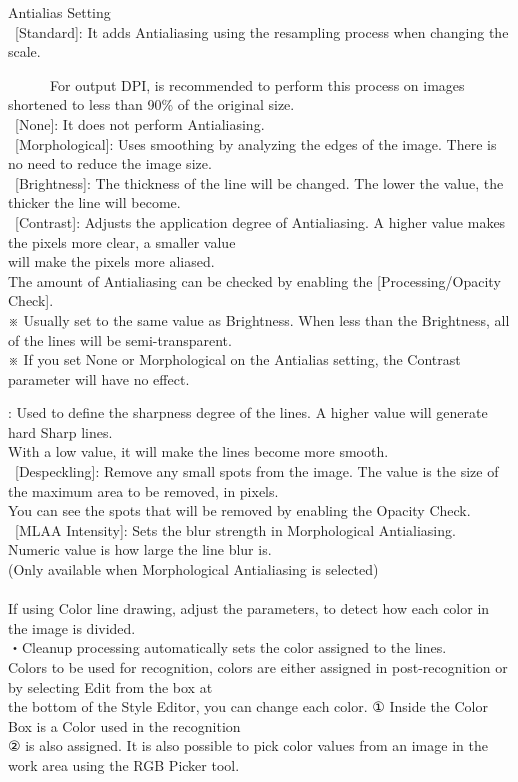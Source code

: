 \documentclass[a4paper,10pt]{article}
\begin{document}
\footnotesize
\noindent Antialias Setting\\
\ [Standard]: It adds Antialiasing using the resampling process when changing the scale.\par
\ \ \ \ \ \ For output DPI, is recommended to perform this process on images shortened to less than 90\% of the original size.\\
\ [None]: It does not perform Antialiasing.\\
\ [Morphological]: Uses smoothing by analyzing the edges of the image. There is no need to reduce the image size.\\
\ [Brightness]: The thickness of the line will be changed. The lower the value, the thicker the line will become.\\
\ [Contrast]: Adjusts the application degree of Antialiasing. A higher value makes the pixels more clear, a smaller value\\
will make the pixels more aliased.\\
The amount of Antialiasing can be checked by enabling the [Processing/Opacity Check].\\
※ Usually set to the same value as Brightness. When less than the Brightness, all of the lines will be semi-transparent.\\
※ If you set None or Morphological on the Antialias setting, the Contrast parameter will have no effect.

\newpage

\noindent [Sharpness]: Used to define the sharpness degree of the lines. A higher value will generate hard Sharp lines.\\
With a low value, it will make the lines become more smooth.\\
\ [Despeckling]: Remove any small spots from the image. The value is the size of the maximum area to be removed, in pixels.\\
You can see the spots that will be removed by enabling the Opacity Check.\\
\ [MLAA Intensity]: Sets the blur strength in Morphological Antialiasing. Numeric value is how large the line blur is.\\
(Only available when Morphological Antialiasing is selected)\\
\\
\small
If using Color line drawing, adjust the parameters, to detect how each color in the image is divided.\\
\footnotesize
・Cleanup processing automatically sets the color assigned to the lines.\\
Colors to be used for recognition, colors are either assigned in post-recognition or by selecting Edit from the box at\\
the bottom of the Style Editor, you can change each color. ①  Inside the Color Box is a Color used in the recognition\\
② is also assigned. It is also possible to pick color values from an image in the work area using the RGB Picker tool.
\end{document}
